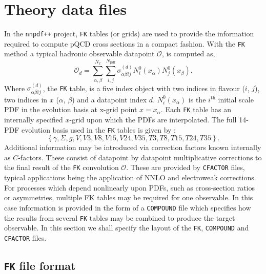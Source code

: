 \documentclass[11pt]{article}
\newcommand{\be}{\begin{equation}}
\newcommand{\ee}{\end{equation}}
\begin{document}

\section{Theory data files} \label{sec:theory}
In the {\tt nnpdf++} project, {\tt FK} tables (or grids) are used to provide the information required to compute pQCD cross sections in a compact fashion.
With the {\tt FK} method a typical hadronic observable datapoint $\mathcal{O}$, is computed as,
\be \mathcal{O}_d= \sum_{\alpha,\beta}^{N_x}\sum_{i,j}^{N_{\mathrm{pdf}}} \sigma^{(d)}_{\alpha\beta i j}N_i^0(x_\alpha)N_j^0(x_\beta). \label{eq:FKprod}\ee
Where $\sigma_{\alpha\beta i j}^{(d)}$, the {\tt FK} table, is a five index object with two indices in flavour ($i$, $j$), two indices in $x$ ($\alpha$, $\beta$) and a datapoint index $d$. $N^0_i({x_\alpha})$ is the $i^{\mathrm{th}}$ initial scale PDF in the evolution basis at x-grid point $x=x_\alpha$. Each {\tt FK} table has an internally specified $x$-grid upon which the PDFs are interpolated.
The full 14-PDF evolution basis used in the {\tt FK} tables is given by :
\be \left\{ \gamma, \Sigma,g,V,V3,V8,V15,V24,V35,T3,T8,T15,T24,T35\right\}. \label{eq:evolbasis} \ee
Additional information may be introduced via correction factors known internally as $C$-factors. These consist of datapoint by datapoint multiplicative corrections to the final result of the {\tt FK} convolution $\mathcal{O}$. These are provided by {\tt CFACTOR} files, typical applications being the application of NNLO and electroweak corrections.
For processes which depend nonlinearly upon PDFs, such as cross-section ratios or asymmetries, multiple FK tables may be required for one observable. In this case information is provided in the form of a {\tt COMPOUND} file which specifies how the results from several {\tt FK} tables may be combined to produce the target observable.
In this section we shall specify the layout of the {\tt FK}, {\tt COMPOUND} and {\tt CFACTOR} files.
\subsection{{\tt FK} file format}
\end{document}
